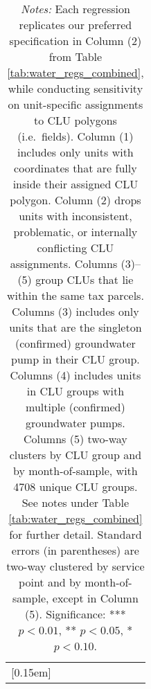 \begin{table}[t!]
\begin{adjustbox}{center}
\begin{tabular}{lcccccccc}
$$[0.15em]
\hline
\end{tabular}
\end{adjustbox}
\captionsetup{width=\textwidth}
\caption*{\scriptsize \emph{Notes:} 
Each regression replicates our preferred specification in Column (2) from Table \ref{tab:water_regs_combined}, 
while conducting sensitivity on unit-specific assignments to CLU polygons (i.e.\ fields). 
Column (1) includes only units with coordinates that are fully inside their assigned CLU polygon.
Column (2) drops units with inconsistent, problematic, or internally conflicting CLU assignments.
Columns (3)--(5) group CLUs that lie within the same tax parcels.
Columns (3) includes only units that are the singleton (confirmed) groundwater pump in their CLU group.
Columns (4) includes units in CLU groups with multiple (confirmed) groundwater pumps.
Columns (5) two-way clusters by CLU group and by month-of-sample, with 4708 unique CLU groups.
See notes under Table \ref{tab:water_regs_combined} for further detail. 
Standard errors (in parentheses) are two-way clustered by service point and by month-of-sample, except in Column (5).
Significance: *** $p < 0.01$, ** $p < 0.05$, * $p < 0.10$.
}
\end{table}
